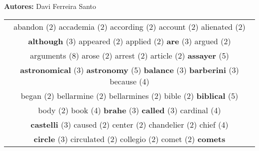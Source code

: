 \documentclass[12pt,a4paper]{article}
\begin{document}
\begin{center}
{\bf Autores:} {\sc Davi Ferreira Santo} \\
\vspace*{0.3cm}


\end{center}


\begin{center}
\begin{tabular}{|c|}
\hline
{\footnotesize \textcolor{Verde} {abandon}} \footnotesize{(2)} {\footnotesize \textcolor{Verde} {accademia}} \footnotesize{(2)} {\footnotesize \textcolor{Verde} {according}} \footnotesize{(2)} {\footnotesize \textcolor{Verde} {account}} \footnotesize{(2)} {\footnotesize \textcolor{Verde} {alienated}} \footnotesize{(2)}  \\ {\small \textcolor{Laranja} {\bf although}} \footnotesize{(3)} {\footnotesize \textcolor{Verde} {appeared}} \footnotesize{(2)} {\footnotesize \textcolor{Verde} {applied}} \footnotesize{(2)} {\small \textcolor{Laranja} {\bf are}} \footnotesize{(3)} {\footnotesize \textcolor{Verde} {argued}} \footnotesize{(2)}  \\ {\huge \textcolor{Amarelo} {arguments}} \footnotesize{(8)} {\footnotesize \textcolor{Verde} {arose}} \footnotesize{(2)} {\footnotesize \textcolor{Verde} {arrest}} \footnotesize{(2)} {\footnotesize \textcolor{Verde} {article}} \footnotesize{(2)} {\large \textcolor{Roxo} {\bf assayer}} \footnotesize{(5)}  \\ {\small \textcolor{Laranja} {\bf astronomical}} \footnotesize{(3)} {\large \textcolor{Roxo} {\bf astronomy}} \footnotesize{(5)} {\small \textcolor{Laranja} {\bf balance}} \footnotesize{(3)} {\small \textcolor{Laranja} {\bf barberini}} \footnotesize{(3)} {\normalsize \textcolor{VerdeLocao} {because}} \footnotesize{(4)}  \\ {\footnotesize \textcolor{Verde} {began}} \footnotesize{(2)} {\footnotesize \textcolor{Verde} {bellarmine}} \footnotesize{(2)} {\footnotesize \textcolor{Verde} {bellarmines}} \footnotesize{(2)} {\footnotesize \textcolor{Verde} {bible}} \footnotesize{(2)} {\large \textcolor{Roxo} {\bf biblical}} \footnotesize{(5)}  \\ {\footnotesize \textcolor{Verde} {body}} \footnotesize{(2)} {\normalsize \textcolor{VerdeLocao} {book}} \footnotesize{(4)} {\small \textcolor{Laranja} {\bf brahe}} \footnotesize{(3)} {\small \textcolor{Laranja} {\bf called}} \footnotesize{(3)} {\normalsize \textcolor{VerdeLocao} {cardinal}} \footnotesize{(4)}  \\ {\small \textcolor{Laranja} {\bf castelli}} \footnotesize{(3)} {\footnotesize \textcolor{Verde} {caused}} \footnotesize{(2)} {\footnotesize \textcolor{Verde} {center}} \footnotesize{(2)} {\footnotesize \textcolor{Verde} {chandelier}} \footnotesize{(2)} {\normalsize \textcolor{VerdeLocao} {chief}} \footnotesize{(4)}  \\ {\small \textcolor{Laranja} {\bf circle}} \footnotesize{(3)} {\footnotesize \textcolor{Verde} {circulated}} \footnotesize{(2)} {\footnotesize \textcolor{Verde} {collegio}} \footnotesize{(2)} {\footnotesize \textcolor{Verde} {comet}} \footnotesize{(2)} {\large \textcolor{Roxo} {\bf comets}} 
\end{tabular}
\end{center}
\end{document}
